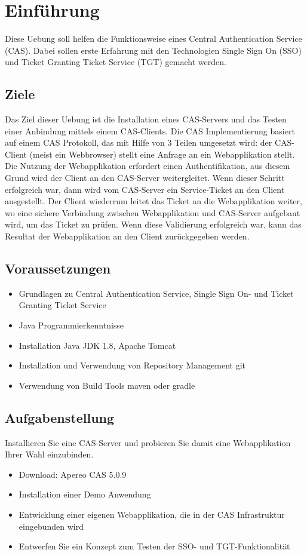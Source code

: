 
\section{Einführung}
\label{sec:Einführung}
Diese Uebung soll helfen die Funktionsweise eines Central Authentication Service (CAS). Dabei sollen erste Erfahrung mit den Technologien Single Sign On (SSO) und Ticket Granting Ticket Service (TGT) gemacht werden.
\subsection{Ziele}
Das Ziel dieser Uebung ist die Installation eines CAS-Servers und das Testen einer Anbindung mittels einem CAS-Clients. Die CAS Implementierung basiert auf einem CAS Protokoll, das mit Hilfe von 3 Teilen umgesetzt wird: der CAS-Client (meist ein Webbrowser) stellt eine Anfrage an ein Webapplikation stellt. Die Nutzung der Webapplikation erfordert einen Authentifikation, aus diesem Grund wird der Client an den CAS-Server weitergleitet. Wenn dieser Schritt erfolgreich war, dann wird vom CAS-Server ein Service-Ticket an den Client ausgestellt. Der Client wiederrum leitet das Ticket an die Webapplikation weiter, wo eine sichere Verbindung zwischen Webapplikation und CAS-Server aufgebaut wird, um das Ticket zu prüfen. Wenn diese Validierung erfolgreich war, kann das Resultat der Webapplikation an den Client zurückgegeben werden.

\subsection{Voraussetzungen}

\begin{itemize}
	\item Grundlagen zu Central Authentication Service, Single Sign On- und Ticket Granting Ticket Service
	\item Java Programmierkenntnisse
	\item Installation Java JDK 1.8, Apache Tomcat
	\item Installation und Verwendung von Repository Management git
	\item Verwendung von Build Tools maven oder gradle
\end{itemize}


\subsection{Aufgabenstellung}
Installieren Sie eine CAS-Server und probieren Sie damit eine Webapplikation Ihrer Wahl einzubinden.
\begin{itemize}
	\item Download: Apereo CAS 5.0.9
	\item Installation einer Demo Anwendung
	\item Entwicklung einer eigenen Webapplikation, die in der CAS Infrastruktur eingebunden wird
	\item Entwerfen Sie ein Konzept zum Testen der SSO- und TGT-Funktionalität
\end{itemize}




\clearpage
